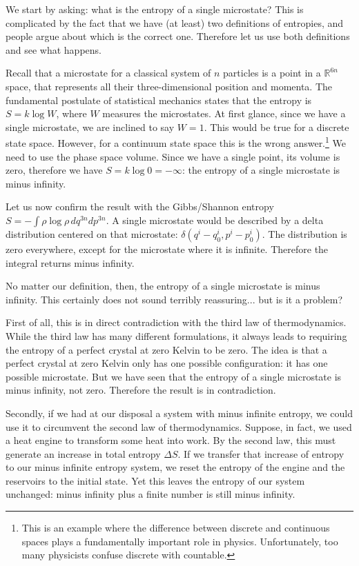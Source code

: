 \documentclass[10pt,twocolumn, nofootinbib]{revtex4-2}
\begin{document}
We start by asking: what is the entropy of a single microstate? This is complicated by the fact that we have (at least) two definitions of entropies, and people argue about which is the correct one. Therefore let us use both definitions and see what happens.

Recall that a microstate for a classical system of $n$ particles is a point in a $\mathbb{R}^{6n}$ space, that represents all their three-dimensional position and momenta. The fundamental postulate of statistical mechanics states that the entropy is $S = k \log W$, where $W$ measures the  microstates. At first glance, since we have a single microstate, we are inclined to say $W = 1$. This would be true for a discrete state space. However, for a continuum state space this is the wrong answer.\footnote{This is an example where the difference between discrete and continuous spaces plays a fundamentally important role in physics. Unfortunately, too many physicists confuse discrete with countable.} We need to use the phase space volume. Since we have a single point, its volume is zero, therefore we have $S = k \log 0 = -\infty$: the entropy of a single microstate is minus infinity.

Let us now confirm the result with the Gibbs/Shannon entropy $S = -\int \rho \log \rho \, dq^{3n} dp^{3n}$. A single microstate would be described by a delta distribution centered on that microstate: $\delta(q^i-q^i_0, p^i-p^i_0)$. The distribution is zero everywhere, except for the microstate where it is infinite. Therefore the integral returns minus infinity.

No matter our definition, then, the entropy of a single microstate is minus infinity. This certainly does not sound terribly reassuring... but is it a problem?

First of all, this is in direct contradiction with the third law of thermodynamics. While the third law has many different formulations, it always leads to requiring the entropy of a perfect crystal at zero Kelvin to be zero. The idea is that a perfect crystal at zero Kelvin only has one possible configuration: it has one possible microstate. But we have seen that the entropy of a single microstate is minus infinity, not zero. Therefore the result is in contradiction.

Secondly, if we had at our disposal a system with minus infinite entropy, we could use it to circumvent the second law of thermodynamics. Suppose, in fact, we used a heat engine to transform some heat into work. By the second law, this must generate an increase in total entropy $\Delta S$. If we transfer that increase of entropy to our minus infinite entropy system, we reset the entropy of the engine and the reservoirs to the initial state. Yet this leaves the entropy of our system unchanged: minus infinity plus a finite number is still minus infinity.
\end{document}
